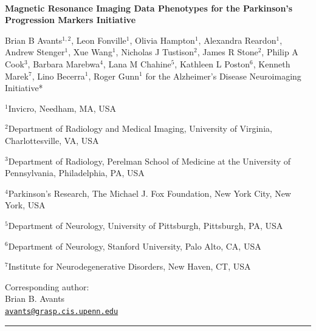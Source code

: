 \documentclass[
  table]{article}
\author{}
\date{\vspace{-2.5em}}
\begin{document}
\begin{centering}

$ $

\vspace{0.1 cm}

\LARGE

{\bf Magnetic Resonance Imaging Data Phenotypes for the Parkinson's Progression Markers Initiative}

\vspace{1.0 cm}

\normalsize

Brian B Avants$^{1,2}$,
Leon Fonville$^{1}$,
Olivia Hampton$^{1}$,
Alexandra Reardon$^{1}$,
Andrew Stenger$^{1}$,
Xue Wang$^{1}$,
Nicholas J Tustison$^{2}$,
James R Stone$^{2}$,
Philip A Cook$^3$,
Barbara Marebwa$^4$,
Lana M Chahine$^5$,
Kathleen L Poston$^6$,
Kenneth Marek$^7$,
Lino Becerra$^{1}$,
Roger Gunn$^{1}$
for the Alzheimer's Disease Neuroimaging Initiative*


\vspace{0.25 cm}

\small

$^1$Invicro, Needham, MA, USA

$^2$Department of Radiology and Medical Imaging, University of Virginia, Charlottesville, VA, USA

$^3$Department of Radiology, Perelman School of Medicine at the University of Pennsylvania, Philadelphia, PA, USA

$^4$Parkinson's Research, The Michael J. Fox Foundation,  New York City, New York, USA

$^5$Department of Neurology, University of Pittsburgh, Pittsburgh, PA, USA

$^6$Department of Neurology, Stanford University, Palo Alto, CA, USA

$^7$Institute for Neurodegenerative Disorders, New Haven, CT, USA


\end{centering}

\vspace{2.2 cm}

\small

Corresponding author:\\
Brian B. Avants\\
\href{mailto:avants@grasp.cis.upenn.edu}{\nolinkurl{avants@grasp.cis.upenn.edu}}

\noindent

\rule{4cm}{0.4pt}

\footnotesize
\end{document}
